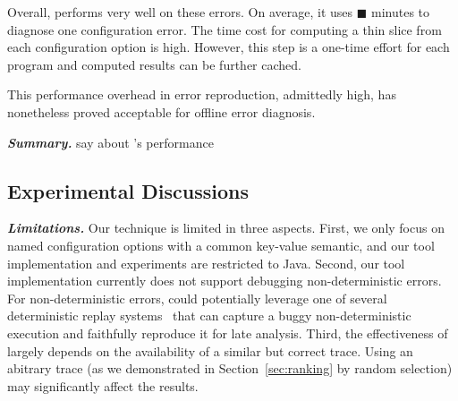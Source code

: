 Overall, \ourtool performs very well on these errors.
On average, it uses $\blacksquare$ minutes to
diagnose one configuration error. The time cost for
computing a thin slice from each configuration option
is high. However, this step is a one-time effort
for each program and computed results can be further cached.

This performance overhead in error reproduction,
admittedly high, has nonetheless proved acceptable
for offline error diagnosis.




\vspace{1mm}
\noindent \textbf{\textit{Summary.}} say about \ourtool's performance

\vspace{1mm}

\subsection{Experimental Discussions}


\noindent \textbf{\textit{Limitations.}} 
Our technique is limited in three aspects.
First, we only focus on named configuration options
with a common key-value semantic, and our tool implementation
and experiments are
restricted to Java. 
Second,  our tool implementation currently does not
support debugging non-deterministic errors. 
For non-deterministic errors, \ourtool could potentially leverage one of
several deterministic replay systems~\cite{Huang:2010:LLD}
that can capture a buggy non-deterministic
execution and faithfully reproduce it for late analysis.
Third, the effectiveness of \ourtool largely
depends on the availability of a similar but correct trace.
Using an abitrary trace (as we demonstrated in Section~\ref{sec:ranking}
by random selection) may significantly affect the results.







